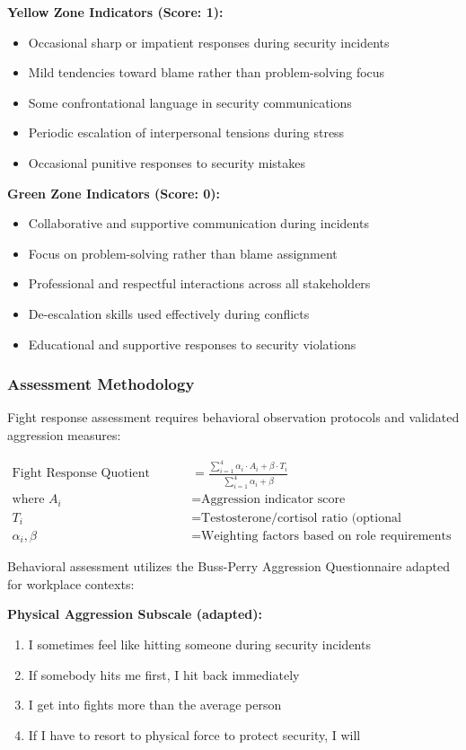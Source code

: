 \documentclass[11pt,a4paper]{article}
\begin{document}
\textbf{Yellow Zone Indicators (Score: 1):}
\begin{itemize}
\item Occasional sharp or impatient responses during security incidents
\item Mild tendencies toward blame rather than problem-solving focus
\item Some confrontational language in security communications
\item Periodic escalation of interpersonal tensions during stress
\item Occasional punitive responses to security mistakes
\end{itemize}

\textbf{Green Zone Indicators (Score: 0):}
\begin{itemize}
\item Collaborative and supportive communication during incidents
\item Focus on problem-solving rather than blame assignment
\item Professional and respectful interactions across all stakeholders
\item De-escalation skills used effectively during conflicts
\item Educational and supportive responses to security violations
\end{itemize}

\subsubsection{Assessment Methodology}

Fight response assessment requires behavioral observation protocols and validated aggression measures:

\begin{align}
\text{Fight Response Quotient (FRQ)} &= \frac{\sum_{i=1}^{4} \alpha_i \cdot A_i + \beta \cdot T_i}{\sum_{i=1}^{4} \alpha_i + \beta} \\
\text{where } A_i &= \text{Aggression indicator score} \\
T_i &= \text{Testosterone/cortisol ratio (optional biomarker)} \\
\alpha_i, \beta &= \text{Weighting factors based on role requirements}
\end{align}

Behavioral assessment utilizes the Buss-Perry Aggression Questionnaire adapted for workplace contexts:

\textbf{Physical Aggression Subscale (adapted):}
\begin{enumerate}
\item I sometimes feel like hitting someone during security incidents
\item If somebody hits me first, I hit back immediately
\item I get into fights more than the average person
\item If I have to resort to physical force to protect security, I will
\end{enumerate}
\end{document}
